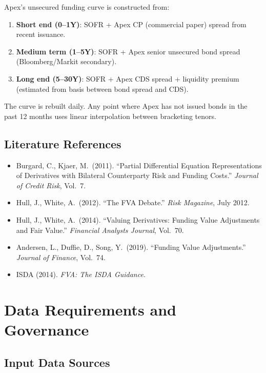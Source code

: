 \documentclass[11pt,a4paper]{article}
\begin{document}
Apex's unsecured funding curve is constructed from:

\begin{enumerate}[leftmargin=*]
  \item \textbf{Short end (0--1Y)}: SOFR + Apex CP (commercial paper) spread from recent issuance.
  \item \textbf{Medium term (1--5Y)}: SOFR + Apex senior unsecured bond spread (Bloomberg/Markit secondary).
  \item \textbf{Long end (5--30Y)}: SOFR + Apex CDS spread + liquidity premium (estimated from basis between bond spread and CDS).
\end{enumerate}

The curve is rebuilt daily. Any point where Apex has not issued bonds in the past 12 months
uses linear interpolation between bracketing tenors.

\subsection{Literature References}

\begin{itemize}[leftmargin=*]
  \item Burgard, C., Kjaer, M.\ (2011). ``Partial Differential Equation Representations of Derivatives with Bilateral Counterparty Risk and Funding Costs.'' \textit{Journal of Credit Risk}, Vol.\ 7.
  \item Hull, J., White, A.\ (2012). ``The FVA Debate.'' \textit{Risk Magazine}, July 2012.
  \item Hull, J., White, A.\ (2014). ``Valuing Derivatives: Funding Value Adjustments and Fair Value.'' \textit{Financial Analysts Journal}, Vol.\ 70.
  \item Andersen, L., Duffie, D., Song, Y.\ (2019). ``Funding Value Adjustments.'' \textit{Journal of Finance}, Vol.\ 74.
  \item ISDA (2014). \textit{FVA: The ISDA Guidance}.
\end{itemize}

\section{Data Requirements and Governance}

\subsection{Input Data Sources}
\end{document}
